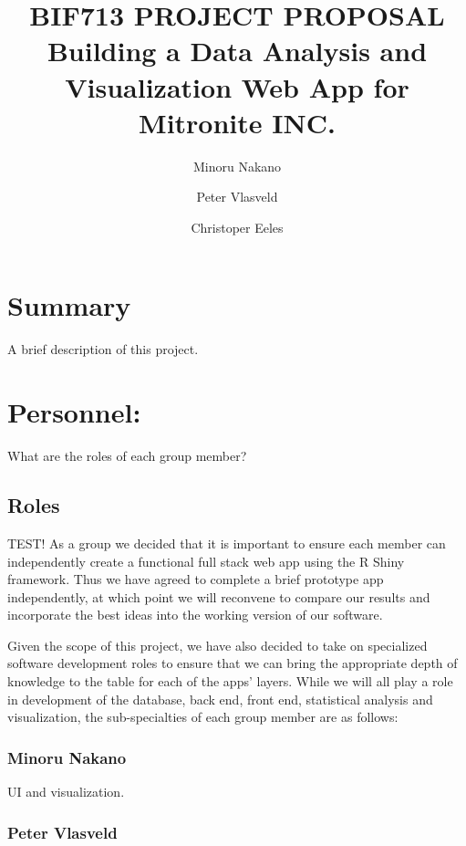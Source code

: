\documentclass[10pt,twocolumn,letterpaper]{article}
\title{
		\usefont{OT1}{bch}{b}{n}
		\normalfont \normalsize \textsc{BIF713 PROJECT PROPOSAL} \\ [14pt]
		\huge Building a Data Analysis and Visualization Web App for Mitronite INC. \\
}
\author{Minoru Nakano}
\author{Peter Vlasveld}
\author{Christoper Eeles}
\begin{document}
\maketitle


\section*{Summary}
A brief description of this project.

\section{Personnel:}
    	
    	What are the roles of each group member?
        
            \subsection{Roles}
            
            TEST! As a group we decided that it is important to ensure each member can independently create a functional full stack web app using the R Shiny framework. Thus we have agreed to complete a brief prototype app independently, at which point we will reconvene to compare our results and incorporate the best ideas into the working version of our software. 
            
            Given the scope of this project, we have also decided to take on specialized software development roles to ensure that we can bring the appropriate depth of knowledge to the table for each of the apps' layers.
            While we will all play a role in development of the database, back end, front end, statistical analysis and visualization, the sub-specialties of each group member are as follows:
            
                \subsubsection*{Minoru Nakano}
                
                UI and visualization.
            
                \subsubsection*{Peter Vlasveld}
                
\end{document}
